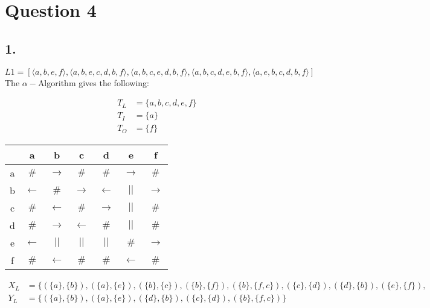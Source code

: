 \section*{Question 4}
\subsection*{1.}
\begin{equation*}
L1= [\langle a,b,e,f\rangle ,\langle a,b,e,c,d,b,f\rangle ,\langle a,b,c,e,d,b
,f\rangle ,\langle a,b,c,d,e,b,f\rangle ,\langle a,e,b,c,d,b,f\rangle ]
\end{equation*}
The $\alpha-$Algorithm gives the following:

\begin{align*}
T_L &= \{ a,b,c,d,e,f\}\\
T_I &= \{a\}\\
T_O &= \{f\}
\end{align*}
\begin{tabular}{c | c c c c c c}
	&a 	  			&b 			 &c 			&d 	  			&e 			   &f\\
	\hline
a	&$\#$ &$\rightarrow$ &$\#$ 			&$\#$ 			&$\rightarrow$ &$\#$\\
b	&$\leftarrow$ &$\#$			 &$\rightarrow$ &$\leftarrow$ 			&$||$ 		  
&$\rightarrow$\\
c	&$\#$ &$\leftarrow$			 &$\#$			&$\rightarrow$  &$||$ 		   &$\#$\\
d	&$\#$ &$\rightarrow$ &$\leftarrow$			&$\#$			&$||$ 		   &$\#$\\
e	&$\leftarrow$ &$||$ 		 &$||$			&$||$  			&$\#$		   &$\rightarrow$\\
f	&$\#$ &$\leftarrow$	 &$\#$			&$\#$			&$\leftarrow$		   &$\#$\\
\end{tabular}

\begin{align*}
X_L &= \{
(\{a\},\{b\}),(\{a\},\{e\}),(\{b\},\{c\}),(\{b\},\{f\}),(\{b\},\{f,c\}),(\{c\},\{d\}),(\{d\},\{b\}),(\{e\},\{f\}),\\
Y_L &=
\{(\{a\},\{b\}),(\{a\},\{e\}),(\{d\},\{b\}),(\{c\},\{d\}),(\{b\},\{f,c\})\}\\
\end{align*}

